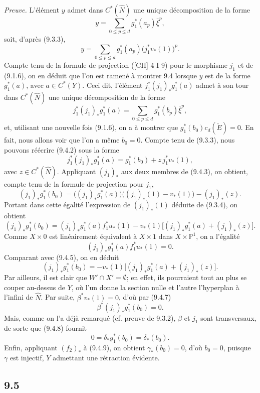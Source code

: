 \documentclass[11pt]{article}
\begin{document}
\emph{Preuve.} L'élément $y$ admet dans $C^*(\widehat N)$ une unique décomposition de la forme
\[
y=\sum_{0\le p\le d}g_1^*(a_p)\bar\xi^p,
\]
soit, d'après (9.3.3),
\[
y=\sum_{0\le p\le d}g_1^*(a_p)\bigl(j_1^*v_*(1)\bigr)^p.
\tag{9.4.1}
\]
Compte tenu de la formule de projection ([CH] 4 I 9) pour le morphisme $j_1$ et de (9.1.6), on en déduit que l'on est ramené à montrer 9.4 lorsque $y$ est de la forme $g_1^*(a)$, avec $a\in C^*(Y)$. Ceci dit, l'élément $j_1^*(j_1)_*g_1^*(a)$ admet à son tour dans $C^*(\widehat N)$ une unique décomposition de la forme
\[
j_1^*(j_1)_*g_1^*(a)=\sum_{0\le p\le d}g_1^*(b_p)\bar\xi^p,
\tag{9.4.2}
\]
et, utilisant une nouvelle fois (9.1.6), on a à montrer que $g_1^*(b_0)c_d(\check E)=0$. En fait, nous allons voir que l'on a même $b_0=0$. Compte tenu de (9.3.3), nous pouvons réécrire (9.4.2) sous la forme
\[
j_1^*(j_1)_*g_1^*(a)=g_1^*(b_0)+z\,j_1^*v_*(1),
\tag{9.4.3}
\]
avec $z\in C^*(\widehat N)$. Appliquant $(j_1)_*$ aux deux membres de (9.4.3), on obtient, compte tenu de la formule de projection pour $j_1$,
\[
(j_1)_*g_1^*(b_0)=\bigl((j_1)_*g_1^*(a)\bigr)\bigl((j_1)_*(1)-v_*(1)\bigr)-(j_1)_*(z).
\tag{9.4.4}
\]
Portant dans cette égalité l'expression de $(j_1)_*(1)$ déduite de (9.3.4), on obtient
\[
(j_1)_*g_1^*(b_0)=
(j_1)_*g_1^*(a)f_1^*u_*(1)-v_*(1)\bigl[(j_1)_*g_1^*(a)+(j_1)_*(z)\bigr].
\tag{9.4.5}
\]
Comme $X\times0$ est linéairement équivalent à $X\times1$ dans $X\times\mathbb P^1$, on a l'égalité
\[
(j_1)_*g_1^*(a)f_1^*u_*(1)=0.
\tag{9.4.6}
\]
Comparant avec (9.4.5), on en déduit
\[
(j_1)_*g_1^*(b_0)=-v_*(1)\bigl[(j_1)_*g_1^*(a)+(j_1)_*(z)\bigr].
\tag{9.4.7}
\]
Par ailleurs, il est clair que $W'\cap X'=\emptyset$; en effet, ils pourraient tout au plus se couper au-dessus de $Y$, où l'un donne la section nulle et l'autre l'hyperplan à l'infini de $\widehat N$. Par suite, $\beta^*v_*(1)=0$, d'où par (9.4.7)
\[
\beta^*(j_1)_*g_1^*(b_0)=0.
\tag{9.4.8}
\]
Mais, comme on l'a déjà remarqué (cf. preuve de 9.3.2), $\beta$ et $j_1$ sont transversaux, de sorte que (9.4.8) fournit
\[
0=\delta_*g_1^*(b_0)=\delta_*(b_0).
\tag{9.4.9}
\]
Enfin, appliquant $(f_2)_*$ à (9.4.9), on obtient $\gamma_*(b_0)=0$, d'où $b_0=0$, puisque $\gamma$ est injectif, $Y$ admettant une rétraction évidente.

\subsection*{9.5}
\end{document}
